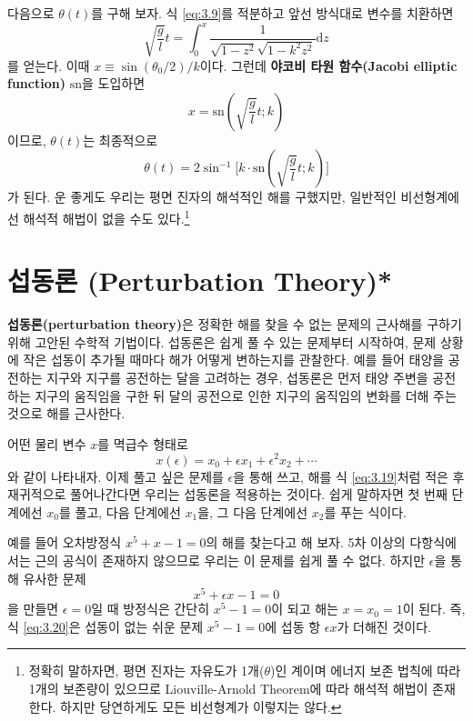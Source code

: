 \documentclass[chapter, oneside, b5paper]{oblivoir}
\theoremstyle{plain}
\theoremstyle{definition}
\theoremstyle{remark}
\begin{document}
다음으로 $\theta(t)$를 구해 보자. 식 \ref{eq:3.9}를 적분하고 앞선 방식대로 변수를 치환하면
\begin{equation}
    \sqrt{\frac{g}{l}}t = \int_0^x \frac{1}{\sqrt{1-z^2}\sqrt{1-k^2z^2}}\mathrm{d}z
    \label{eq:3.16}
\end{equation}
를 얻는다. 이때 $x \equiv \sin{(\theta_0/2)}/k$이다. 그런데 \textbf{야코비 타원 함수(Jacobi elliptic function)} $\mathrm{sn}$을 도입하면
\begin{equation}
    x = \mathrm{sn}(\sqrt{\frac{g}{l}}t ; k)
\end{equation}
이므로, $\theta(t)$는 최종적으로
\begin{equation}
    \theta(t) = 2 \sin^{-1}[k \cdot {\mathrm{sn}(\sqrt{\frac{g}{l}}t ; k)]}
\end{equation}가 된다. 운 좋게도 우리는 평면 진자의 해석적인 해를 구했지만, 일반적인 비선형계에선 해석적 해법이 없을 수도 있다.\footnote{정확히 말하자면, 평면 진자는 자유도가 1개($\theta$)인 계이며 에너지 보존 법칙에 따라 1개의 보존량이 있으므로 Liouville-Arnold Theorem에 따라 해석적 해법이 존재한다. 하지만 당연하게도 모든 비선형계가 이렇지는 않다.}

\section{섭동론 (Perturbation Theory)*}
\textbf{섭동론(perturbation theory)}은 정확한 해를 찾을 수 없는 문제의 근사해를 구하기 위해 고안된 수학적 기법이다. 섭동론은 쉽게 풀 수 있는 문제부터 시작하여, 문제 상황에 작은 섭동이 추가될 때마다 해가 어떻게 변하는지를 관찰한다. 예를 들어 태양을 공전하는 지구와 지구를 공전하는 달을 고려하는 경우, 섭동론은 먼저 태양 주변을 공전하는 지구의 움직임을 구한 뒤 달의 공전으로 인한 지구의 움직임의 변화를 더해 주는 것으로 해를 근사한다.

어떤 물리 변수 $x$를 멱급수 형태로
\begin{equation}
    x(\epsilon) = x_0 + \epsilon x_1 + \epsilon^2 x_2 + \cdots
    \label{eq:3.19}
\end{equation}
와 같이 나타내자. 이제 풀고 싶은 문제를 $\epsilon$을 통해 쓰고, 해를 식 \ref{eq:3.19}처럼 적은 후 재귀적으로 풀어나간다면 우리는 섭동론을 적용하는 것이다. 쉽게 말하자면 첫 번째 단계에선 $x_0$를 풀고, 다음 단계에선 $x_1$을, 그 다음 단계에선 $x_2$를 푸는 식이다.

예를 들어 오차방정식 $x^5+x-1=0$의 해를 찾는다고 해 보자. 5차 이상의 다항식에서는 근의 공식이 존재하지 않으므로 우리는 이 문제를 쉽게 풀 수 없다. 하지만 $\epsilon$을 통해 유사한 문제
\begin{equation}
    x^5 + \epsilon x - 1=0 
    \label{eq:3.20}
\end{equation}
을 만들면 $\epsilon =0$일 때 방정식은 간단히 $x^5-1=0$이 되고 해는 $x=x_0=1$이 된다. 즉, 식 \ref{eq:3.20}은 섭동이 없는 쉬운 문제 $x^5-1=0$에 섭동 항 $\epsilon x$가 더해진 것이다.
\end{document}

